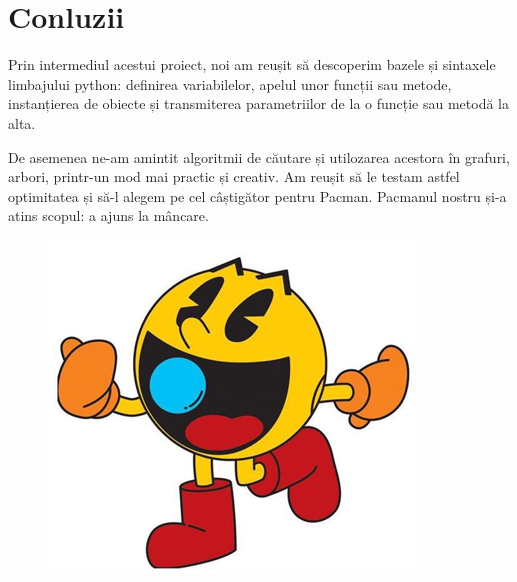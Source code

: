 \section{Conluzii}
Prin intermediul acestui proiect, noi am reușit să descoperim bazele și sintaxele limbajului python: definirea variabilelor, apelul unor funcții sau metode, instanțierea de obiecte și transmiterea parametriilor de la o funcție sau metodă la alta. 

De asemenea ne-am amintit algoritmii de căutare și utilozarea acestora în grafuri, arbori, printr-un mod mai practic și creativ. Am reușit să le testam astfel optimitatea și să-l alegem pe cel câștigător pentru Pacman.
Pacmanul nostru și-a atins scopul: a ajuns la mâncare.\newline\newline

\begin{figure}[h]
    \centering
    \includegraphics[width5cm]{text/images/pacman.png}\\

\end{figure}

